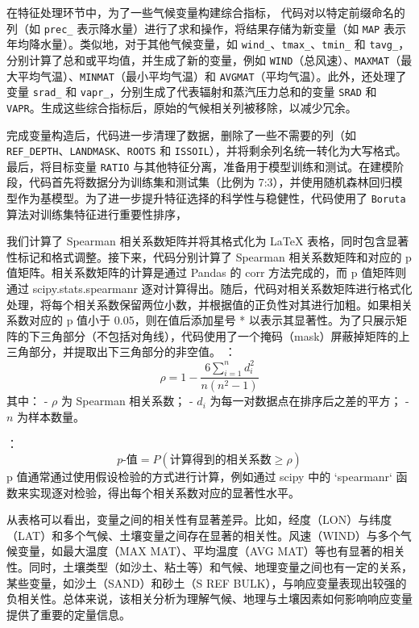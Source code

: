 \documentclass[AutoFakeBold]{LZUThesis-PgD&PhD}
\begin{document}
	在特征处理环节中，为了一些气候变量构建综合指标，
	代码对以特定前缀命名的列（如 \texttt{prec\_} 表示降水量）进行了求和操作，将结果存储为新变量（如 \texttt{MAP} 表示年均降水量）。类似地，对于其他气候变量，如 \texttt{wind\_}、\texttt{tmax\_}、\texttt{tmin\_} 和 \texttt{tavg\_}，分别计算了总和或平均值，并生成了新的变量，例如 \texttt{WIND}（总风速）、\texttt{MAXMAT}（最大平均气温）、\texttt{MINMAT}（最小平均气温）和 \texttt{AVGMAT}（平均气温）。此外，还处理了变量 \texttt{srad\_} 和 \texttt{vapr\_}，分别生成了代表辐射和蒸汽压力总和的变量 \texttt{SRAD} 和 \texttt{VAPR}。生成这些综合指标后，原始的气候相关列被移除，以减少冗余。
	
	完成变量构造后，代码进一步清理了数据，删除了一些不需要的列（如 \texttt{REF\_DEPTH}、\texttt{LANDMASK}、\texttt{ROOTS} 和 \texttt{ISSOIL}），并将剩余列名统一转化为大写格式。最后，将目标变量 \texttt{RATIO} 与其他特征分离，准备用于模型训练和测试。在建模阶段，代码首先将数据分为训练集和测试集（比例为 7:3），并使用随机森林回归模型作为基模型。为了进一步提升特征选择的科学性与稳健性，代码使用了 \texttt{Boruta} 算法对训练集特征进行重要性排序，
	
	
	我们计算了 Spearman 相关系数矩阵并将其格式化为 LaTeX 表格，同时包含显著性标记和格式调整。接下来，代码分别计算了 Spearman 相关系数矩阵和对应的 p 值矩阵。相关系数矩阵的计算是通过 Pandas 的 corr 方法完成的，而 p 值矩阵则通过 scipy.stats.spearmanr 逐对计算得出。随后，代码对相关系数矩阵进行格式化处理，将每个相关系数保留两位小数，并根据值的正负性对其进行加粗。如果相关系数对应的 p 值小于 0.05，则在值后添加星号 * 以表示其显著性。为了只展示矩阵的下三角部分（不包括对角线），代码使用了一个掩码（mask）屏蔽掉矩阵的上三角部分，并提取出下三角部分的非空值。
	：
	\[
	\rho = 1 - \frac{6 \sum_{i=1}^{n} d_i^2}{n(n^2 - 1)}
	\]
	其中：
	- \( \rho \) 为 Spearman 相关系数；
	- \( d_i \) 为每一对数据点在排序后之差的平方；
	- \( n \) 为样本数量。
	
	：
	\[
	p\text{-值} = P(\text{计算得到的相关系数} \geq \rho)
	\]
	p 值通常通过使用假设检验的方式进行计算，例如通过 scipy 中的 `spearmanr` 函数来实现逐对检验，得出每个相关系数对应的显著性水平。
	
	从表格可以看出，变量之间的相关性有显著差异。比如，经度（LON）与纬度（LAT）和多个气候、土壤变量之间存在显著的相关性。风速（WIND）与多个气候变量，如最大温度（MAX MAT）、平均温度（AVG MAT）等也有显著的相关性。同时，土壤类型（如沙土、粘土等）和气候、地理变量之间也有一定的关系，某些变量，如沙土（SAND）和砂土（S REF BULK），与响应变量表现出较强的负相关性。总体来说，该相关分析为理解气候、地理与土壤因素如何影响响应变量提供了重要的定量信息。
	
\end{document}

